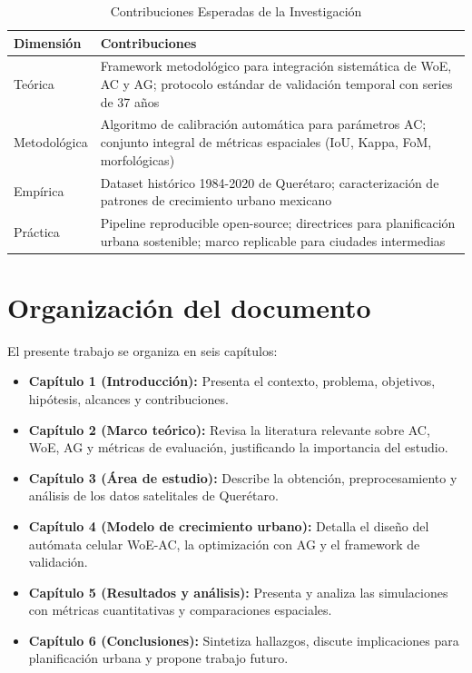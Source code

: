 \begin{table}[htbp]
\centering
\caption{Contribuciones Esperadas de la Investigación}
\label{tab:contributions}
\begin{tabular}{lp{10cm}}
\toprule
\textbf{Dimensión} & \textbf{Contribuciones} \\
\midrule
Teórica & Framework metodológico para integración sistemática de WoE, AC y AG; protocolo estándar de validación temporal con series de 37 años \\
Metodológica & Algoritmo de calibración automática para parámetros AC; conjunto integral de métricas espaciales (IoU, Kappa, FoM, morfológicas) \\
Empírica & Dataset histórico 1984-2020 de Querétaro; caracterización de patrones de crecimiento urbano mexicano \\
Práctica & Pipeline reproducible open-source; directrices para planificación urbana sostenible; marco replicable para ciudades intermedias \\
\bottomrule
\end{tabular}
\end{table}

\section{Organización del documento}

El presente trabajo se organiza en seis capítulos:
\begin{itemize}
	\item \textbf{Capítulo 1 (Introducción):} Presenta el contexto, problema, objetivos, hipótesis, alcances y contribuciones.
	\item \textbf{Capítulo 2 (Marco teórico):} Revisa la literatura relevante sobre AC, WoE, AG y métricas de evaluación, justificando la importancia del estudio.
	\item \textbf{Capítulo 3 (Área de estudio):} Describe la obtención, preprocesamiento y análisis de los datos satelitales de Querétaro.
	\item \textbf{Capítulo 4 (Modelo de crecimiento urbano):} Detalla el diseño del autómata celular WoE-AC, la optimización con AG y el framework de validación.
	\item \textbf{Capítulo 5 (Resultados y análisis):} Presenta y analiza las simulaciones con métricas cuantitativas y comparaciones espaciales.
	\item \textbf{Capítulo 6 (Conclusiones):} Sintetiza hallazgos, discute implicaciones para planificación urbana y propone trabajo futuro.
\end{itemize}
